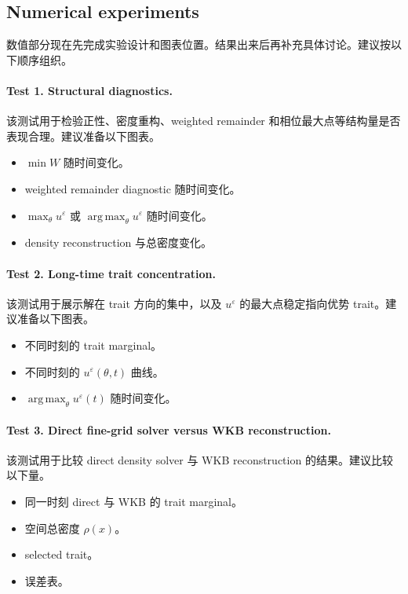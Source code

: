 \documentclass[11pt,a4paper]{ctexart}
\newcommand{\eps}{\varepsilon}
\newcommand{\argmax}{\operatorname*{arg\,max}}
\begin{document}
\subsection{Numerical experiments}

数值部分现在先完成实验设计和图表位置。结果出来后再补充具体讨论。建议按以下顺序组织。

\paragraph{Test 1. Structural diagnostics.}

该测试用于检验正性、密度重构、weighted remainder 和相位最大点等结构量是否表现合理。建议准备以下图表。
\begin{itemize}
    \item $\min W$ 随时间变化。
    \item weighted remainder diagnostic 随时间变化。
    \item $\max_\theta u^\eps$ 或 $\argmax_\theta u^\eps$ 随时间变化。
    \item density reconstruction 与总密度变化。
\end{itemize}

\paragraph{Test 2. Long-time trait concentration.}

该测试用于展示解在 trait 方向的集中，以及 $u^\eps$ 的最大点稳定指向优势 trait。建议准备以下图表。
\begin{itemize}
    \item 不同时刻的 trait marginal。
    \item 不同时刻的 $u^\eps(\theta,t)$ 曲线。
    \item $\argmax_\theta u^\eps(t)$ 随时间变化。
\end{itemize}

\paragraph{Test 3. Direct fine-grid solver versus WKB reconstruction.}

该测试用于比较 direct density solver 与 WKB reconstruction 的结果。建议比较以下量。
\begin{itemize}
    \item 同一时刻 direct 与 WKB 的 trait marginal。
    \item 空间总密度 $\rho(x)$。
    \item selected trait。
    \item 误差表。
\end{itemize}
\end{document}
